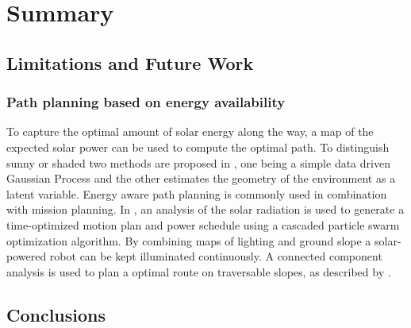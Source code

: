 \chapter{Summary}
\label{chp:summary}

\section{Limitations and Future Work}






\subsection{Path planning based on energy availability}

To capture the optimal amount of solar energy along the way, a map of the expected solar power can be used to compute the optimal path. To distinguish sunny or shaded two methods are proposed in \cite{plonski_tranro_2016}, one being a simple data driven Gaussian Process and the other estimates the geometry of the environment as a latent variable.
Energy aware path planning is commonly used in combination with mission planning.
In \cite{kaplan_iros_2016}, an analysis of the solar radiation is used to generate a time-optimized motion plan and power schedule using a cascaded particle swarm optimization algorithm.
By combining maps of lighting and ground slope a solar-powered robot can be kept illuminated continuously. A connected component analysis is used to plan a optimal route on traversable slopes, as described by \cite{otten_icra_2015}.

\section{Conclusions}
